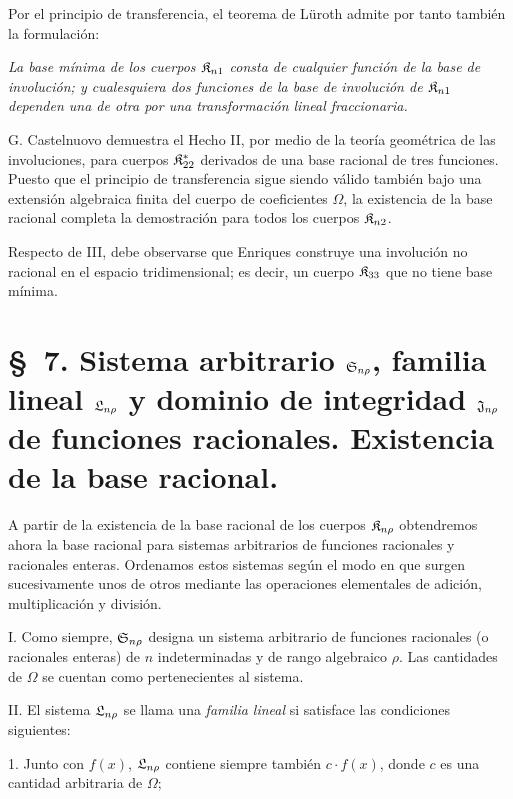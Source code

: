 \documentclass[11pt]{article}
\newcommand{\eps}{\varepsilon}
\begin{document}
Por el principio de transferencia, el teorema de Lüroth admite por tanto también la formulación:

\emph{La base mínima de los cuerpos $\mathfrak{K}_{n1}$ consta de cualquier función de la base de involución; y cualesquiera dos funciones de la base de involución de $\mathfrak{K}_{n1}$ dependen una de otra por una transformación lineal fraccionaria.}

G. Castelnuovo demuestra el Hecho II, por medio de la teoría geométrica de las involuciones, para cuerpos $\mathfrak{K}^*_{22}$ derivados de una base racional de tres funciones. Puesto que el principio de transferencia sigue siendo válido también bajo una extensión algebraica finita del cuerpo de coeficientes $\Omega$, la existencia de la base racional completa la demostración para todos los cuerpos $\mathfrak{K}_{n2}$.

Respecto de III, debe observarse que Enriques construye una involución no racional en el espacio tridimensional; es decir, un cuerpo $\mathfrak{K}_{33}$ que no tiene base mínima.


\providecommand{\Gdom}{\mathfrak{G}}
\providecommand{\Omegaint}{[\Omega]}
\providecommand{\eps}{\varepsilon}

\clearpage
\section*{\S\ 7. Sistema arbitrario $\mathfrak{S}_{n\rho}$, familia lineal $\mathfrak{L}_{n\rho}$ y dominio de integridad $\mathfrak{J}_{n\rho}$ de funciones racionales. Existencia de la base racional.}

A partir de la existencia de la base racional de los cuerpos $\mathfrak{K}_{n\rho}$ obtendremos ahora la base racional para sistemas arbitrarios de funciones racionales y racionales enteras. Ordenamos estos sistemas según el modo en que surgen sucesivamente unos de otros mediante las operaciones elementales de adición, multiplicación y división.

I. Como siempre, $\mathfrak{S}_{n\rho}$ designa un sistema arbitrario de funciones racionales (o racionales enteras) de $n$ indeterminadas y de rango algebraico $\rho$. Las cantidades de $\Omega$ se cuentan como pertenecientes al sistema.

II. El sistema $\mathfrak{L}_{n\rho}$ se llama una \emph{familia lineal} si satisface las condiciones siguientes:

1. Junto con $f(x)$, $\mathfrak{L}_{n\rho}$ contiene siempre también $c\cdot f(x)$, donde $c$ es una cantidad arbitraria de $\Omega$;
\end{document}
